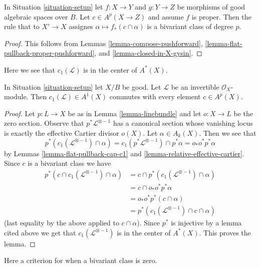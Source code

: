 \begin{lemma}
\label{lemma-push-proper-bivariant}
In Situation \ref{situation-setup} let $f : X \to Y$ and
$g : Y \to Z$ be morphisms of good algebraic spaces over $B$.
Let $c \in A^p(X \to Z)$ and assume $f$ is proper.
Then the rule that to $X' \to X$ assignes
$\alpha \longmapsto f_*(c \cap \alpha)$
is a bivariant class of degree $p$.
\end{lemma}

\begin{proof}
This follows from Lemmas \ref{lemma-compose-pushforward},
\ref{lemma-flat-pullback-proper-pushforward}, and
\ref{lemma-closed-in-X-gysin}.
\end{proof}

\noindent
Here we see that $c_1(\mathcal{L})$ is in the center of $A^*(X)$.

\begin{lemma}
\label{lemma-c1-center}
In Situation \ref{situation-setup} let $X/B$ be good.
Let $\mathcal{L}$ be an invertible $\mathcal{O}_X$-module.
Then $c_1(\mathcal{L}) \in A^1(X)$ commutes with every
element $c \in A^p(X)$.
\end{lemma}

\begin{proof}
Let $p : L \to X$ be as in Lemma \ref{lemma-linebundle} and let $o : X \to L$
be the zero section. Observe that $p^*\mathcal{L}^{\otimes -1}$ has a
canonical section whose vanishing locus is exactly the
effective Cartier divisor $o(X)$. Let $\alpha \in A_k(X)$. Then we see that
$$
p^*(c_1(\mathcal{L}^{\otimes -1}) \cap \alpha) =
c_1(p^*\mathcal{L}^{\otimes -1}) \cap p^*\alpha =
o_* o^* p^*\alpha
$$
by Lemmas \ref{lemma-flat-pullback-cap-c1} and
\ref{lemma-relative-effective-cartier}.
Since $c$ is a bivariant class we have
\begin{align*}
p^*(c \cap c_1(\mathcal{L}^{\otimes -1}) \cap \alpha)
& =
c \cap p^*(c_1(\mathcal{L}^{\otimes -1}) \cap \alpha) \\
& =
c \cap o_* o^* p^*\alpha \\
& =
o_* o^* p^*(c \cap \alpha) \\
& =
p^*(c_1(\mathcal{L}^{\otimes -1}) \cap c \cap \alpha)
\end{align*}
(last equality by the above applied to $c \cap \alpha$).
Since $p^*$ is injective by a lemma cited above we get that
$c_1(\mathcal{L}^{\otimes -1})$
is in the center of $A^*(X)$. This proves the lemma.
\end{proof}

\noindent
Here a criterion for when a bivariant class is zero.

